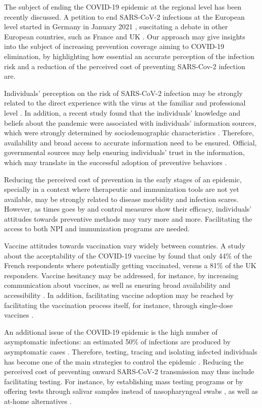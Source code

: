 The subject of ending the COVID-19 epidemic at the regional level has been recently discussed. A petition to end SARS-CoV-2 infections at the European level started in Germany in January 2021 \cite[]{ZeroCovid_EU}, suscitating a debate in other European countries, such as France \cite[]{ZeroCovid_FR} and UK \cite[]{ZeroCovid_UK}. Our approach may give  insights into the subject of increasing prevention coverage aiming to COVID-19 elimination, by highlighting how essential an accurate perception of the infection risk and a reduction of the perceived cost of preventing SARS-Cov-2 infection are. 

Individuals' perception on the risk of SARS-CoV-2 infection may be strongly related to the direct experience with the virus at the familiar and professional level \cite[]{Mansilla2020}. In addition, a recent study found that the individuals' knowledge and beliefs about the pandemic were associated with individuals' information sources, which were strongly determined by sociodemographic characteristics \cite[]{Ali2020}. Therefore, availability and broad access to accurate information need to be ensured. Official, governmental sources may help ensuring  individuals' trust in the information, which may translate in the successful adoption of preventive behaviors \cite[]{Lim2020}.

Reducing the perceived cost of prevention in the early stages of an epidemic, specially in a context where therapeutic and immunization tools are not yet available, may be strongly related to disease morbidity and infection scares. However, as times goes by and control measures show their efficacy, individuals' attitudes towards preventive methods may vary more and more. Facilitating the access to both NPI \cite[]{Sugrue2020} and immunization programs \cite[]{Yamey2020} are needed. 

Vaccine attitudes towards vaccination vary widely between countries. A study about the acceptability of the COVID-19 vaccine by \cite{Wuoters2021} found that only 44\% of the French respondents where potentially getting vaccinated, versus a 81\% of the UK responders. Vaccine hesitancy may be addressed, for instance, by increasing communication about vaccines, as well as ensuring broad availability and accessibility \cite[]{Wuoters2021}. In addition, facilitating vaccine adoption may be reached by facilitating the vaccination process itself, for instance, through single-dose vaccines \cite[]{SanchezFelipe2020}.

An additional issue of the COVID-19 epidemic is the high number of asymptomatic infections: an estimated 50\% of infections are produced by asymptomatic cases \cite[]{Johansson2021}. Therefore, testing, tracing and isolating infected individuals has become one of the main strategies to control the epidemic \cite[]{WHO_COVID19Strategy}. Reducing the perceived cost of preventing onward SARS-CoV-2 transmission may thus include facilitating testing. For instance, by establishing mass testing programs or by offering tests through salivar samples instead of nasopharyngeal swabs \cite[]{Yee2021}, as well as at-home alternatives \cite[]{ValentineGraves2020}. 

